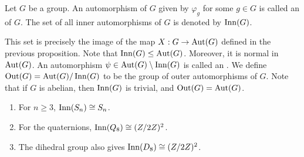 \begin{definition}
    Let $G$ be a group. An automorphism of $G$ given by $\varphi_{g}$ for some $g \in G$ is called an  of $G$. The set of all inner automorphisms of $G$ is denoted by $\operatorname{Inn}(G)$.
\end{definition}
This set is precisely the image of the map $X:G \to \operatorname{Aut}(G)$ defined in the previous proposition. Note that $\operatorname{Inn}(G) \leq \operatorname{Aut}(G)$. Moreover, it is normal in $\operatorname{Aut}(G)$. An automorphism $\psi \in \operatorname{Aut}(G)\setminus \operatorname{Inn}(G)$ is called an . We define $\operatorname{Out}(G) = \operatorname{Aut}(G)/\operatorname{Inn}(G)$ to be the group of outer automorphisms of $G$. Note that if $G$ is abelian, then $\operatorname{Inn}(G)$ is trivial, and $\operatorname{Out}(G) = \operatorname{Aut}(G)$.

\begin{example}
    \begin{enumerate}
        \item For $n \geq 3$, $\operatorname{Inn}(S_{n}) \cong S_{n}$.
        \item For the quaternions, $\operatorname{Inn}(Q_{8}) \cong (Z/2Z)^{2}$.
        \item The dihedral group also gives $\operatorname{Inn}(D_{8}) \cong (Z/2Z)^{2}$.
    \end{enumerate}
\end{example}